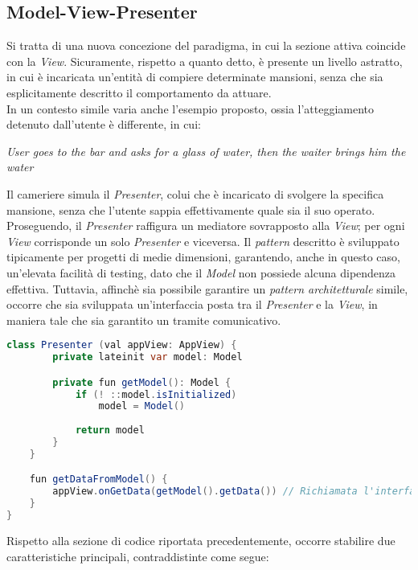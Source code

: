 \documentclass{article}
\begin{document}
\subsection*{Model-View-Presenter}
Si tratta di una nuova concezione del paradigma, in cui la sezione attiva coincide con la \textit{View}. Sicuramente, rispetto a quanto detto, è presente un livello astratto, in cui è incaricata un'entità di compiere determinate mansioni, senza che sia esplicitamente descritto il comportamento da attuare.\vspace*{7pt}\\
In un contesto simile varia anche l'esempio proposto, ossia l'atteggiamento detenuto dall'utente è differente, in cui:
\begin{center}
    \textit{User goes to the bar and asks for a glass of water, then the waiter brings him the water}
\end{center}
Il cameriere simula il \textit{Presenter}, colui che è incaricato di svolgere la specifica mansione, senza che l'utente sappia effettivamente quale sia il suo operato.\vspace*{7pt}\\
Proseguendo, il \textit{Presenter} raffigura un mediatore sovrapposto alla \textit{View}; per ogni \textit{View} corrisponde un solo \textit{Presenter} e viceversa. Il \textit{pattern} descritto è sviluppato tipicamente per progetti di medie dimensioni, garantendo, anche in questo caso, un'elevata facilità di testing, dato che il \textit{Model} non possiede alcuna dipendenza effettiva. Tuttavia, affinchè sia possibile garantire un \textit{pattern architetturale} simile, occorre che sia sviluppata un'interfaccia posta tra il \textit{Presenter} e la \textit{View}, in maniera tale che sia garantito un tramite comunicativo.
\begin{lstlisting}[language = JAVA, title = Esempio implementativo di un Presenter]
class Presenter (val appView: AppView) {
        private lateinit var model: Model

        private fun getModel(): Model {
            if (! ::model.isInitialized)
                model = Model()
                
            return model
        }
    }

    fun getDataFromModel() {
        appView.onGetData(getModel().getData()) // Richiamata l'interfaccia non la View specifica
    }
}
\end{lstlisting}
Rispetto alla sezione di codice riportata precedentemente, occorre stabilire due caratteristiche principali, contraddistinte come segue:
\end{document}
